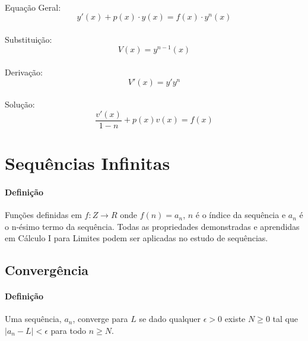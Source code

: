 \documentclass{article}
\begin{document}
                \paragraph{}Equação Geral:
                    \begin{equation}
                        y'(x)+p(x) \cdot y(x)=f(x) \cdot y^{n}(x)
                    \end{equation}
                \paragraph{}Substituição:
                    \begin{equation}
                        V(x)=y^{n-1}(x)
                    \end{equation}
                \paragraph{}Derivação:
                    \begin{equation}
                        V'(x)=y'y^{n}
                    \end{equation}
                \paragraph{}Solução:
                    \begin{equation}
                        \frac{v'(x)}{1-n}+p(x)v(x)=f(x)
                    \end{equation}


    \section{Sequências Infinitas}
        \paragraph{Definição}Funções definidas em $f:Z\to R$ onde $f(n)=a_{n}$, $n$ é o índice da sequência e $a_{n}$ é o n-ésimo termo da sequência. Todas as propriedades demonstradas e aprendidas em Cálculo I para Limites podem ser aplicadas no estudo de sequências. 
        
        \subsection{Convergência}
            \paragraph{Definição}Uma sequência, $a_{n}$, converge para $L$ se dado qualquer $\epsilon > 0$ existe $N \ge 0$ tal que $|a_{n}-L|<\epsilon$ para todo $n \ge N$.
\end{document}

